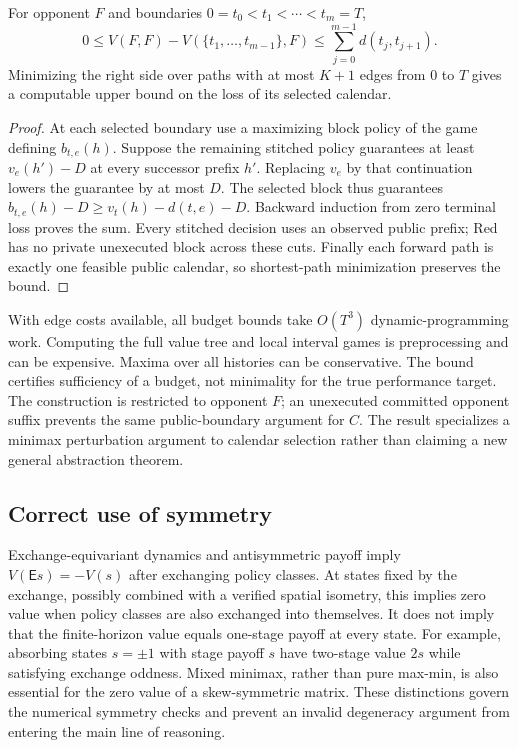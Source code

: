 \begin{theorem}\label{thm:interval}
For opponent $F$ and boundaries $0=t_0<t_1<\cdots<t_m=T$,
\begin{equation}
 0\le V(F,F)-V(\{t_1,\ldots,t_{m-1}\},F)
 \le\sum_{j=0}^{m-1}d(t_j,t_{j+1}).
 \label{eq:intervalloss}
\end{equation}
Minimizing the right side over paths with at most $K+1$ edges from $0$ to $T$
gives a computable upper bound on the loss of its selected calendar.
\end{theorem}
\begin{proof}
At each selected boundary use a maximizing block policy of the game defining
$b_{t,e}(h)$. Suppose the remaining stitched policy guarantees at least
$v_e(h')-D$ at every successor prefix $h'$. Replacing $v_e$ by that
continuation lowers the guarantee by at most $D$. The selected block thus
guarantees $b_{t,e}(h)-D\ge v_t(h)-d(t,e)-D$. Backward induction from zero
terminal loss proves the sum. Every stitched decision uses an observed
public prefix; Red has no private unexecuted block across these cuts.
Finally each forward path is exactly one feasible public calendar, so
shortest-path minimization preserves the bound.
\end{proof}
With edge costs available, all budget bounds take $O(T^3)$ dynamic-programming
work. Computing the full value tree and local interval games is preprocessing
and can be expensive. Maxima over all histories can be conservative.
The bound certifies sufficiency of a budget, not minimality for the true
performance target. The construction is restricted to opponent $F$;
an unexecuted committed opponent suffix prevents the same public-boundary
argument for $C$. The result specializes a minimax perturbation argument
to calendar selection rather than claiming a new general abstraction theorem.

\subsection{Correct use of symmetry}
Exchange-equivariant dynamics and antisymmetric payoff imply
$V(\mathsf E s)=-V(s)$ after exchanging policy classes. At states fixed by
the exchange, possibly combined with a verified spatial isometry, this
implies zero value when policy classes are also exchanged into themselves.
It does not imply that the finite-horizon value equals one-stage payoff at
every state. For example, absorbing states $s=\pm1$ with stage payoff $s$
have two-stage value $2s$ while satisfying exchange oddness. Mixed minimax,
rather than pure max-min, is also essential for the zero value of a
skew-symmetric matrix. These distinctions govern the numerical symmetry
checks and prevent an invalid degeneracy argument from entering the main
line of reasoning.
